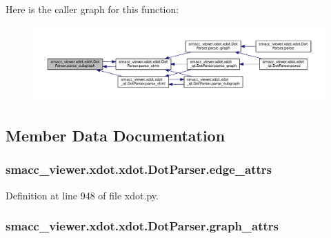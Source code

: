 Here is the caller graph for this function\+:
\nopagebreak
\begin{figure}[H]
\begin{center}
\leavevmode
\includegraphics[width=350pt]{classsmacc__viewer_1_1xdot_1_1xdot_1_1DotParser_aa0071f6f1c4280c56a30bb7613e2746d_icgraph}
\end{center}
\end{figure}




\subsection{Member Data Documentation}
\subsubsection[{\texorpdfstring{edge\+\_\+attrs}{edge_attrs}}]{\setlength{\rightskip}{0pt plus 5cm}smacc\+\_\+viewer.\+xdot.\+xdot.\+Dot\+Parser.\+edge\+\_\+attrs}\hypertarget{classsmacc__viewer_1_1xdot_1_1xdot_1_1DotParser_a9a5788523c2c34ecb8d3fab1135ee272}{}\label{classsmacc__viewer_1_1xdot_1_1xdot_1_1DotParser_a9a5788523c2c34ecb8d3fab1135ee272}


Definition at line 948 of file xdot.\+py.

\subsubsection[{\texorpdfstring{graph\+\_\+attrs}{graph_attrs}}]{\setlength{\rightskip}{0pt plus 5cm}smacc\+\_\+viewer.\+xdot.\+xdot.\+Dot\+Parser.\+graph\+\_\+attrs}\hypertarget{classsmacc__viewer_1_1xdot_1_1xdot_1_1DotParser_a3b9334f4df11771fb8623add522ebe00}{}\label{classsmacc__viewer_1_1xdot_1_1xdot_1_1DotParser_a3b9334f4df11771fb8623add522ebe00}


